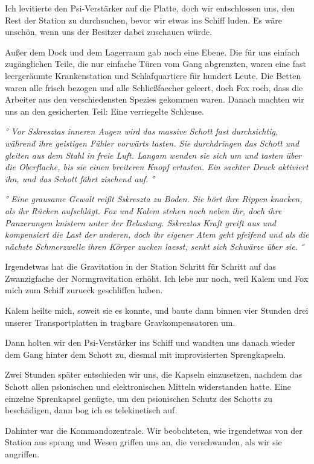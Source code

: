 \documentclass[11pt]{scrartcl}
\begin{document}
Ich levitierte den Psi-Verstärker auf die Platte, doch wir entschlossen
uns, den Rest der Station zu durchsuchen, bevor wir etwas ins Schiff
luden. Es wäre unschön, wenn uns der Besitzer dabei zuschauen würde.

Außer dem Dock und dem Lagerraum gab noch eine Ebene. Die für uns
einfach zugänglichen Teile, die nur einfache Türen vom Gang abgrenzten,
waren eine fast leergeräumte Krankenstation und Schlafquartiere für
hundert Leute. Die Betten waren alle frisch bezogen und alle
Schließfaecher geleert, doch Fox roch, dass die Arbeiter aus den
verschiedensten Spezies gekommen waren. Danach machten wir uns an den
gesicherten Teil: Eine verriegelte Schleuse.

\emph{° Vor Sskresztas inneren Augen wird das massive Schott fast
durchsichtig, während ihre geistigen Fühler vorwärts tasten. Sie
durchdringen das Schott und gleiten aus dem Stahl in freie Luft. Langam
wenden sie sich um und tasten über die Oberflache, bis sie einen
breiteren Knopf ertasten. Ein sachter Druck aktiviert ihn, und das
Schott fährt zischend auf. °}

\emph{° Eine grausame Gewalt reißt Sskreszta zu Boden. Sie hört ihre
Rippen knacken, als ihr Rücken aufschlägt. Fox und Kalem stehen noch
neben ihr, doch ihre Panzerungen knistern unter der Belastung. Sskreztas
Kraft greift aus und kompensiert die Last der anderen, doch ihr eigener
Atem geht pfeifend und als die nächste Schmerzwelle ihren Körper zucken
laesst, senkt sich Schwärze über sie. °}

Irgendetwas hat die Gravitation in der Station Schritt für Schritt auf
das Zwanzigfache der Normgravitation erhöht. Ich lebe nur noch, weil
Kalem und Fox mich zum Schiff zurueck geschliffen haben.

Kalem heilte mich, soweit sie es konnte, und baute dann binnen vier
Stunden drei unserer Transportplatten in tragbare Gravkompensatoren um.

Dann holten wir den Psi-Verstärker ins Schiff und wandten uns danach
wieder dem Gang hinter dem Schott zu, diesmal mit improvisierten
Sprengkapseln.

Zwei Stunden später entschieden wir uns, die Kapseln einzusetzen,
nachdem das Schott allen psionischen und elektronischen Mitteln
widerstanden hatte. Eine einzelne Sprenkapsel genügte, um den
psionischen Schutz des Schotts zu beschädigen, dann bog ich es
telekinetisch auf.

Dahinter war die Kommandozentrale. Wir beobchteten, wie irgendetwas von
der Station aus sprang und Wesen griffen uns an, die verschwanden, als
wir sie angriffen.
\end{document}
